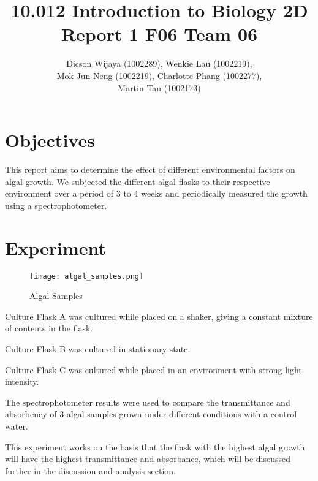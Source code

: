 \documentclass[12pt,a4paper]{IEEEtran}
\author{Dicson Wijaya (1002289), Wenkie Lau (1002219), \\ Mok Jun Neng (1002219), Charlotte Phang (1002277), \\ Martin Tan (1002173)}
\title{10.012 Introduction to Biology 2D \\ Report 1 F06 Team 06}
\begin{document}
	
	\maketitle
	
	\section{Objectives} \vspace{-0.6in}
	This report aims to determine the effect of different environmental factors on algal growth. We subjected the different algal flasks to their respective environment over a period of 3 to 4 weeks and periodically measured the growth using a spectrophotometer. \vspace{-0.8in}
	
	\section{Experiment} \vspace{-0.9in}
	\begin{figure}[H]
		\begin{center}
			\texttt{[image: algal\_samples.png]}
			\caption{Algal Samples}
			\label{fig:algalsamples}
		\end{center}
	\end{figure} \vspace{-0.4in}
    Culture Flask A was cultured while placed on a shaker, giving a constant mixture of contents in the flask. \\ \vspace{-4mm}
    
    Culture Flask B was cultured in stationary state. \\ \vspace{-4mm}
    
    Culture Flask C was cultured while placed in an environment with strong light intensity. \\ \vspace{-2mm}
    
    The spectrophotometer results were used to compare the transmittance and absorbency of 3 algal samples grown under different conditions with a control water. \\ \vspace{-0.4mm}
    
    This experiment works on the basis that the flask with the highest algal growth will have the highest transmittance and absorbance, which will be discussed further in the discussion and analysis section. \vspace{-0.18in}
    
\end{document}
